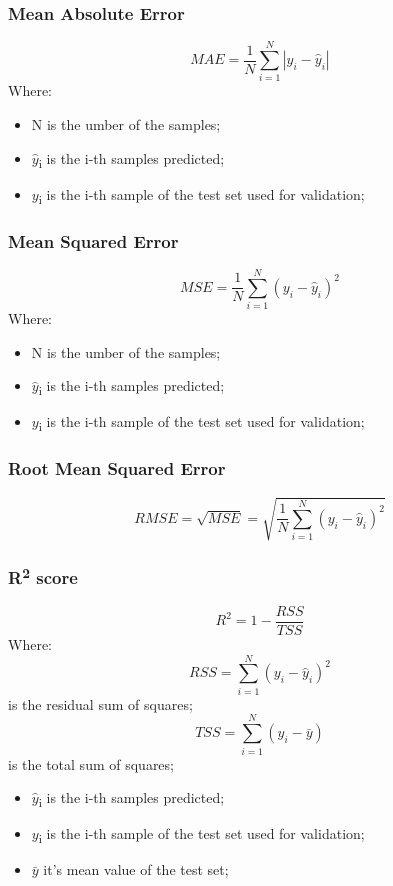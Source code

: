 \subsubsection{Mean Absolute Error}
\begin{equation}
MAE = \frac{1}{N}\sum_{i=1}^{N}|y_i-\hat{y}_i|
\end{equation}
Where:
\begin{itemize}
    \item N is the umber of the samples;
    \item $\hat{y}$\textsubscript{i} is the i-th samples predicted;
    \item $y$\textsubscript{i} is the i-th sample of the test set used for validation;
\end{itemize}
\subsubsection{Mean Squared Error}
\begin{equation}
MSE = \frac{1}{N}\sum_{i=1}^{N}(y_i-\hat{y}_i)^2
\end{equation}
Where:
\begin{itemize}
    \item N is the umber of the samples;
    \item $\hat{y}$\textsubscript{i} is the i-th samples predicted;
    \item $y$\textsubscript{i} is the i-th sample of the test set used for validation;
\end{itemize}
\subsubsection{Root Mean Squared Error}
\begin{equation}
RMSE = \sqrt{MSE}= \sqrt{\frac{1}{N}\sum_{i=1}^{N}(y_i-\hat{y}_i)^2}
\end{equation}
\subsubsection{R\textsuperscript{2} score}
\begin{equation}
R^2 = 1 - \frac{RSS}{TSS}    
\end{equation}
Where:
\begin{equation}RSS = \sum_{i=1}^{N}(y_i-\hat{y}_i)^2 \end{equation}is the residual sum of squares;
\begin{equation} TSS =  \sum_{i=1}^{N}(y_i-\bar{y})\end{equation} is the total sum of squares;
\begin{itemize}
    \item $\hat{y}$\textsubscript{i} is the i-th samples predicted;
    \item $y$\textsubscript{i} is the i-th sample of the test set used for validation;
    \item $\bar{y}$ it's mean value of the test set;
\end{itemize}

